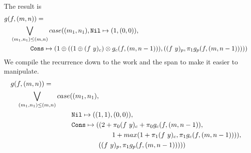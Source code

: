 %
The result is
%
\begin{equation*}
  \begin{split}
  &g(f, (m, n)) = \\
  &\quad \bigvee\limits_{(m_1, n_1) \leq (m, n)} case((m_1, n_1), \texttt{Nil} \mapsto (1, (0, 0)), \\
  &\qquad\quad\quad \texttt{Cons} \mapsto (1 \oplus ((1 \oplus (f\ y)_c) \otimes g_c(f, (m, n-1))), ((f\ y)_p, \pi_1 g_p(f, (m, n-1)))))
  \end{split}
\end{equation*}
%
%
We compile the recurrence down to the work and the span to make it easier to
manipulate.
%
\begin{equation*}
  \begin{split}
  &g(f, (m, n)) = \\
  &\quad \bigvee\limits_{(m_1, n_1) \leq (m, n)} case((m_1, n_1), \\
  &\qquad\quad\quad\quad\qquad\quad\quad \texttt{Nil} \mapsto ((1, 1), (0, 0)), \\
  &\qquad\quad\quad\quad\qquad\quad\quad \texttt{Cons} \mapsto ((2 + \pi_0(f\ y)_c + \pi_0 g_c(f, (m, n-1)), \\
  &\qquad\quad\quad\quad\qquad\quad\quad\quad\qquad\quad\quad\quad                     1 + max(1 + \pi_1(f\ y)_c, \pi_1 g_c(f, (m, n-1)))), \\
  &\qquad\quad\quad\quad\qquad\quad\quad\quad\quad\quad\quad                  ((f\ y)_p, \pi_1 g_p(f, (m, n-1)))))
  \end{split}
\end{equation*}
